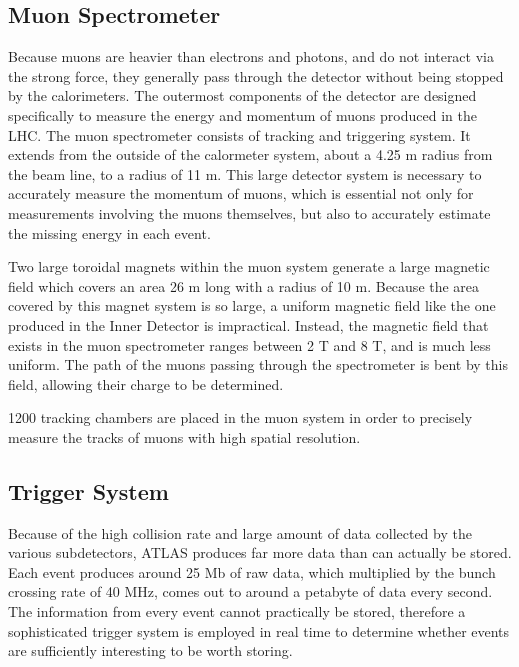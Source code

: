\subsection{Muon Spectrometer}
\label{sec:muonSpec}

Because muons are heavier than electrons and photons, and do not interact via the strong force, they generally pass through the detector without being stopped by the calorimeters. The outermost components of the detector are designed specifically to measure the energy and momentum of muons produced in the LHC. The muon spectrometer consists of tracking and triggering system. It extends from the outside of the calormeter system, about a 4.25 m radius from the beam line, to a radius of 11 m. This large detector system is necessary to accurately measure the momentum of muons, which is essential not only for measurements involving the muons themselves, but also to accurately estimate the missing energy in each event.

Two large toroidal magnets within the muon system generate a large magnetic field which covers an area 26 m long with a radius of 10 m. Because the area covered by this magnet system is so large, a uniform magnetic field like the one produced in the Inner Detector is impractical. Instead, the magnetic field that exists in the muon spectrometer ranges between 2 T and 8 T, and is much less uniform. The path of the muons passing through the spectrometer is bent by this field, allowing their charge to be determined. 

1200 tracking chambers are placed in the muon system in order to precisely measure the tracks of muons with high spatial resolution.


\subsection{Trigger System}
\label{sec:trigger}

Because of the high collision rate and large amount of data collected by the various subdetectors, ATLAS produces far more data than can actually be stored. Each event produces around 25 Mb of raw data, which multiplied by the bunch crossing rate of 40 MHz, comes out to around a petabyte of data every second. The information from every event cannot practically be stored, therefore a sophisticated trigger system is employed in real time to determine whether events are sufficiently interesting to be worth storing.

